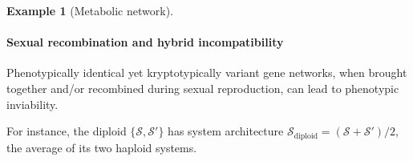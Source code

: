 \documentclass{article}
\newcommand{\1}{\mathbbm{1}}
\newcommand{\Sys}{\mathcal{S}}
\newtheorem{example}{Example}
\begin{document}
\begin{example}[Metabolic network]
%
%
\end{example}

\paragraph{Sexual recombination and hybrid incompatibility}
Phenotypically identical yet kryptotypically variant gene networks, when brought together and/or recombined during sexual reproduction, can lead to phenotypic inviability. 

    For instance, the diploid $\{\Sys, \Sys' \}$ has system architecture $\Sys_{\text{diploid}} \! = \! \left(\Sys \! + \! \Sys'\right)\!/2$, the average of its two haploid systems.
\end{document}
